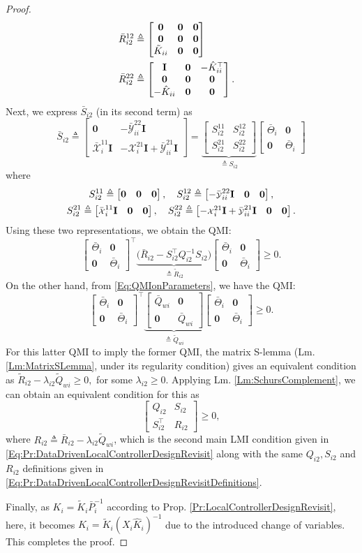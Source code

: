 \documentclass[letterpaper, 10 pt, conference]{ieeeconf}%
\newcommand{\T}{\top}
\newcommand{\I}{\mathbf{I}}
\newcommand{\0}{\mathbf{0}}
\newcommand{\X}{\mathcal{X}}
\newcommand{\Y}{\mathcal{Y}}
\newcommand{\x}{{\scriptstyle \X}}
\newcommand{\y}{{\scriptstyle \Y}}
\newcommand{\bm}[1]{\begin{bmatrix}#1\end{bmatrix}}
\begin{document}
\begin{proof}
\begin{align*}
\bar{R}_{i2}^{12} \triangleq \bm{ \0 & \0 & \0 \\ \0 & \0 & \0 \\ \tilde{K}_{ii} & \0 & \0}\\ \span
\bar{R}_{i2}^{22} \triangleq \bm{ \I & \0 & -\hat{K}_{ii}^\T \\ \0 & \0 & \0 \\ -\hat{K}_{ii} & \0 & \0}. 
\end{align*}
Next, we express $\bar{S}_{i2}$ (in its second term) as
$$
\bar{S}_{i2} \triangleq \bm{ \0 & -\bar{\y}^{22}_{ii}\I \\ \bar{\x}_i^{11}\I & -\x_i^{21}\I + \bar{\y}^{21}_{ii}\I} 
= \underbrace{\bm{S_{i2}^{11} & S_{i2}^{12} \\ S_{i2}^{21}  & S_{i2}^{22}}}_{\triangleq S_{i2}}
\bm{\bar{\Theta}_i & \0 \\ \0 & \bar{\Theta}_i}
$$
where
\begin{align*}\span
S_{i2}^{11} \triangleq \bm{ \0 & \0 & \0 }, \quad     
S_{i2}^{12} \triangleq \bm{ -\bar{\y}^{22}_{ii}\I & \0 & \0 },\\  \span
S_{i2}^{21} \triangleq \bm{ \bar{\x}_i^{11}\I & \0 & \0 }, \quad 
S_{i2}^{22} \triangleq \bm{ -\x_i^{21}\I + \bar{\y}^{21}_{ii}\I & \0 & \0}. 
\end{align*}
Using these two representations, we obtain the QMI:
$$
\bm{\bar{\Theta}_i & \0 \\ \0 & \bar{\Theta}_i}^\T 
\underbrace{\big( \bar{R}_{i2} - S_{i2}^\T Q_{i2}^{-1} S_{i2}  \big)}_{\triangleq \tilde{R}_{i2}} \bm{\bar{\Theta}_i & \0 \\ \0 & \bar{\Theta}_i} \geq 0.
$$
On the other hand, from \eqref{Eq:QMIonParameters}, we have the QMI: 
$$
\bm{\bar{\Theta}_i & \0 \\ \0 & \bar{\Theta}_i}^\T 
\underbrace{\bm{\bar{Q}_{wi} & \0 \\ \0 & \bar{Q}_{wi}}}_{\triangleq \tilde{Q}_{wi}}
\bm{\bar{\Theta}_i & \0 \\ \0 & \bar{\Theta}_i} \geq 0.
$$
For this latter QMI to imply the former QMI, the matrix S-lemma (Lm. \ref{Lm:MatrixSLemma}, under its regularity condition) gives an equivalent condition as 
$
\tilde{R}_{i2} - \lambda_{i2} \tilde{Q}_{wi} \geq 0,
$
for some $\lambda_{i2} \geq 0$. Applying Lm. \ref{Lm:SchursComplement}, we can obtain an equivalent condition for this as
$$
\bm{Q_{i2} & S_{i2} \\ S_{i2}^\T & R_{i2}} \geq 0,
$$
where $R_{i2} \triangleq  \bar{R}_{i2} - \lambda_{i2} \tilde{Q}_{wi}$, which is the second main LMI condition given in \eqref{Eq:Pr:DataDrivenLocalControllerDesignRevisit} along with the same $Q_{i2}, S_{i2}$ and $R_{i2}$ definitions given in \eqref{Eq:Pr:DataDrivenLocalControllerDesignRevisitDefinitions}. 

Finally, as $K_i = \tilde{K}_i \bar{P}_i^{-1}$ according to Prop. \ref{Pr:LocalControllerDesignRevisit}, here, it becomes $K_i = \tilde{K}_i (X_i \hat{K}_i)^{-1}$ due to the introduced change of variables. This completes the proof.
\end{proof}
 
\end{document}
